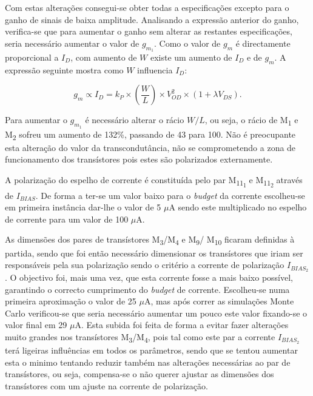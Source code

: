 \documentclass[11pt]{article}
\numberwithin{equation}{section}
\begin{document}
Com estas alterações consegui-se obter todas a especificações excepto para o ganho de sinais de baixa amplitude. Analisando a expressão anterior do ganho, verifica-se que para aumentar o ganho sem alterar as restantes especificações, seria necessário aumentar o valor de $g_{m_1}$. Como o valor de $g_m$ é directamente proporcional a $I_D$, com aumento de $W$ existe um aumento de $I_D$ e de $g_m$. A expressão seguinte mostra como $W$ influencia $I_D$:

\vspace{-3mm}
\begin{equation}
g_{m} \propto I_{D}= k_P \times \left(\frac{W}{L}\right) \times V_{OD}^2 \times \left(1+\lambda V_{DS}\right).
\end{equation}

Para aumentar o $g_{m_1}$ é necessário alterar o rácio $W/L$, ou seja, o rácio de M\textsubscript{1} e M\textsubscript{2} sofreu um aumento de 132\%, passando de 43 para 100. Não é preocupante esta alteração do valor da transcondutância, não se comprometendo a zona de funcionamento dos transístores pois estes são polarizados externamente.

A polarização do espelho de corrente é constituída pelo par M\textsubscript{11\textsubscript{1}} e M\textsubscript{11\textsubscript{2}} através de $I_{BIAS}$. De forma a ter-se um valor baixo para o \textit{budget} da corrente escolheu-se em primeira instância dar-lhe o valor de 5 $\mu$A sendo este multiplicado no espelho de corrente para um valor de 100 $\mu$A.

As dimensões dos pares de transístores M\textsubscript{3}/M\textsubscript{4} e  M\textsubscript{9}/ M\textsubscript{10} ficaram definidas à partida, sendo que foi então necessário dimensionar os transístores que iriam ser responsáveis pela sua polarização sendo o critério a corrente de polarização $I_{BIAS_{2}}$. O objectivo foi, mais uma vez, que esta corrente fosse a mais baixo possível, garantindo o correcto cumprimento do \textit{budget} de corrente. Escolheu-se numa primeira aproximação o valor de 25 $\mu$A, mas após correr as simulações Monte Carlo verificou-se que seria necessário aumentar um pouco este valor fixando-se o valor final em 29 $\mu$A. Esta subida foi feita de forma a evitar fazer alterações muito grandes nos transístores M\textsubscript{3}/M\textsubscript{4}, pois tal como este par a corrente $I_{BIAS_{2}}$ terá ligeiras influências em todos os parâmetros, sendo que se tentou aumentar esta o minimo tentando reduzir também nas alterações necessárias ao par de transístores, ou seja, compensa-se o não querer ajustar as dimensões dos transístores com um ajuste na corrente de polarização.
 
\end{document}
